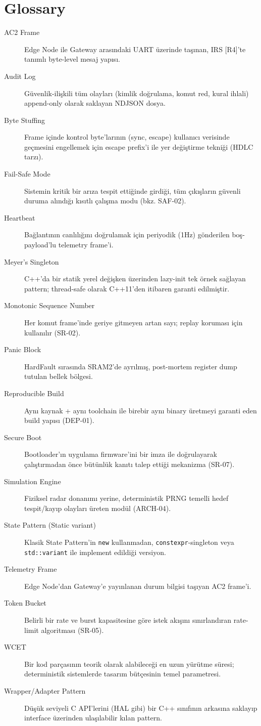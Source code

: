 \section{Glossary}

\begin{description}
    \item[AC2 Frame] Edge Node ile Gateway arasındaki UART üzerinde taşınan, IRS [R4]'te tanımlı byte-level mesaj yapısı.
    \item[Audit Log] Güvenlik-ilişkili tüm olayları (kimlik doğrulama, komut red, kural ihlali) append-only olarak saklayan NDJSON dosya.
    \item[Byte Stuffing] Frame içinde kontrol byte'larının (sync, escape) kullanıcı verisinde geçmesini engellemek için escape prefix'i ile yer değiştirme tekniği (HDLC tarzı).
    \item[Fail-Safe Mode] Sistemin kritik bir arıza tespit ettiğinde girdiği, tüm çıkışların güvenli duruma alındığı kısıtlı çalışma modu (bkz. SAF-02).
    \item[Heartbeat] Bağlantının canlılığını doğrulamak için periyodik (1Hz) gönderilen boş-payload'lu telemetry frame'i.
    \item[Meyer's Singleton] C++'da bir statik yerel değişken üzerinden lazy-init tek örnek sağlayan pattern; thread-safe olarak C++11'den itibaren garanti edilmiştir.
    \item[Monotonic Sequence Number] Her komut frame'inde geriye gitmeyen artan sayı; replay koruması için kullanılır (SR-02).
    \item[Panic Block] HardFault sırasında SRAM2'de ayrılmış, post-mortem register dump tutulan bellek bölgesi.
    \item[Reproducible Build] Aynı kaynak + aynı toolchain ile birebir aynı binary üretmeyi garanti eden build yapısı (DEP-01).
    \item[Secure Boot] Bootloader'ın uygulama firmware'ini bir imza ile doğrulayarak çalıştırmadan önce bütünlük kanıtı talep ettiği mekanizma (SR-07).
    \item[Simulation Engine] Fiziksel radar donanımı yerine, deterministik PRNG temelli hedef tespit/kayıp olayları üreten modül (ARCH-04).
    \item[State Pattern (Static variant)] Klasik State Pattern'in \texttt{new} kullanmadan, \texttt{constexpr}-singleton veya \texttt{std::variant} ile implement edildiği versiyon.
    \item[Telemetry Frame] Edge Node'dan Gateway'e yayınlanan durum bilgisi taşıyan AC2 frame'i.
    \item[Token Bucket] Belirli bir rate ve burst kapasitesine göre istek akışını sınırlandıran rate-limit algoritması (SR-05).
    \item[WCET] Bir kod parçasının teorik olarak alabileceği en uzun yürütme süresi; deterministik sistemlerde tasarım bütçesinin temel parametresi.
    \item[Wrapper/Adapter Pattern] Düşük seviyeli C API'lerini (HAL gibi) bir C++ sınıfının arkasına saklayıp interface üzerinden ulaşılabilir kılan pattern.
\end{description}
